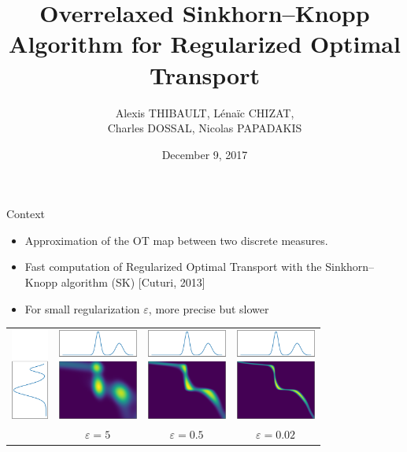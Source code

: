 \documentclass[compress]{beamer}
\title[Overrelaxed SK Algorithm]{Overrelaxed Sinkhorn--Knopp Algorithm for Regularized Optimal Transport}
\author[A. THIBAULT]{
	Alexis THIBAULT, 
	L\'ena\"ic CHIZAT,\\
	Charles DOSSAL,
	Nicolas PAPADAKIS
}
\institute[OTML'17]{Optimal Transport and Machine Learning workshop \\ NIPS 2017}
\date{December 9, 2017}
\renewcommand{\epsilon}{\varepsilon}
\begin{document}
\titlepage

\begin{frame}
{Context} 
\begin{itemize}
\item Approximation of the OT map between two discrete measures.
\item Fast computation of Regularized Optimal Transport with the Sinkhorn--Knopp algorithm (SK) {\color{blue}[Cuturi, 2013]}
\item For small regularization $\epsilon$, more precise but slower
\end{itemize}
\begin{tabular}{c c c c}
	\includegraphics[height=3cm]{1d_interp_mu} &
	\includegraphics[height=3cm]{1d_interp_0_2} &
	\includegraphics[height=3cm]{1d_interp_2} &
	\includegraphics[height=3cm]{1d_interp_18} \\
	&
	$\epsilon = 5$ &
	$\epsilon = 0.5$ &
	$\epsilon = 0.02$
\end{tabular}
\end{frame}


\begin{frame}
	\tableofcontents
\end{frame}
\end{document}
